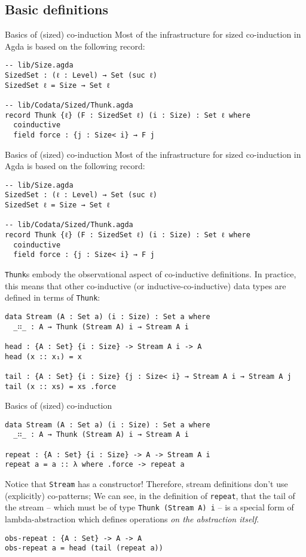 \documentclass[t,aspectratio=169,9pt]{beamer}
\begin{document}
\subsection[coinduction]{Basic definitions}
\begin{frame}[fragile]{Basics of (sized) co-induction}
  Most of the infrastructure for sized co-induction in Agda is based on the
  following record:
\begin{verbatim}
-- lib/Size.agda
SizedSet : (ℓ : Level) → Set (suc ℓ)
SizedSet ℓ = Size → Set ℓ

-- lib/Codata/Sized/Thunk.agda
record Thunk {ℓ} (F : SizedSet ℓ) (i : Size) : Set ℓ where
  coinductive
  field force : {j : Size< i} → F j
\end{verbatim}
\end{frame}
\begin{frame}{Basics of (sized) co-induction}
  Most of the infrastructure for sized co-induction in Agda is based on the
  following record:
\begin{verbatim}
-- lib/Size.agda
SizedSet : (ℓ : Level) → Set (suc ℓ)
SizedSet ℓ = Size → Set ℓ

-- lib/Codata/Sized/Thunk.agda
record Thunk {ℓ} (F : SizedSet ℓ) (i : Size) : Set ℓ where
  coinductive
  field force : {j : Size< i} → F j
\end{verbatim}
\texttt{Thunk}s embody the observational aspect of co-inductive
definitions. In practice, this means that other co-inductive (or
inductive-co-inductive) data types are defined in terms of
\texttt{Thunk}:
\begin{verbatim}
data Stream (A : Set a) (i : Size) : Set a where
  _∷_ : A → Thunk (Stream A) i → Stream A i

head : {A : Set} {i : Size} -> Stream A i -> A
head (x :: x₁) = x

tail : {A : Set} {i : Size} {j : Size< i} → Stream A i → Stream A j
tail (x :: xs) = xs .force
\end{verbatim}
\end{frame}
\begin{frame}{Basics of (sized) co-induction}
\vfill

\begin{verbatim}
data Stream (A : Set a) (i : Size) : Set a where
  _∷_ : A → Thunk (Stream A) i → Stream A i

repeat : {A : Set} {i : Size} -> A -> Stream A i
repeat a = a :: λ where .force -> repeat a
\end{verbatim}
\vfill
Notice that \texttt{Stream} has a constructor! Therefore, stream
definitions don't use (explicitly) co-patterns; We can see, in the definition of
\texttt{repeat}, that the tail of the stream -- which must be of type
\texttt{Thunk (Stream {A}) i} -- is a special form of
lambda-abstraction which defines operations {\it on the abstraction itself}.
\vfill
\begin{verbatim}
obs-repeat : {A : Set} -> A -> A
obs-repeat a = head (tail (repeat a))
\end{verbatim}
\vfill
\end{frame}
\end{document}
